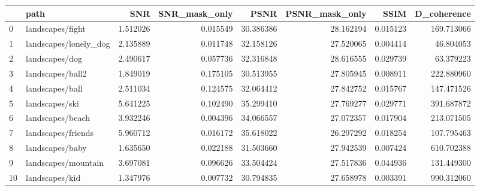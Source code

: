 \begin{tabular}{llrrrrrr}
\toprule
{} &                   path &       SNR &  SNR\_mask\_only &       PSNR &  PSNR\_mask\_only &      SSIM &  D\_coherence \\
\midrule
0  &       landscapes/fight &  1.512026 &       0.015549 &  30.386386 &       28.162194 &  0.015123 &   169.713066 \\
1  &  landscapes/lonely\_dog &  2.135889 &       0.011748 &  32.158126 &       27.520065 &  0.004414 &    46.804053 \\
2  &         landscapes/dog &  2.490617 &       0.057736 &  32.316848 &       28.616555 &  0.029739 &    63.379223 \\
3  &       landscapes/ball2 &  1.849019 &       0.175105 &  30.513955 &       27.805945 &  0.008911 &   222.880960 \\
4  &        landscapes/ball &  2.511034 &       0.124575 &  32.064412 &       27.842752 &  0.015767 &   147.471526 \\
5  &         landscapes/ski &  5.641225 &       0.102490 &  35.299410 &       27.769277 &  0.029771 &   391.687872 \\
6  &       landscapes/beach &  3.932246 &       0.004396 &  34.066557 &       27.072357 &  0.017904 &   213.071505 \\
7  &     landscapes/friends &  5.960712 &       0.016172 &  35.618022 &       26.297292 &  0.018254 &   107.795463 \\
8  &        landscapes/baby &  1.635650 &       0.022188 &  31.503660 &       27.942539 &  0.007424 &   610.702388 \\
9  &    landscapes/mountain &  3.697081 &       0.096626 &  33.504424 &       27.517836 &  0.044936 &   131.449300 \\
10 &         landscapes/kid &  1.347976 &       0.007732 &  30.794835 &       27.658978 &  0.003391 &   990.312060 \\
\bottomrule
\end{tabular}
